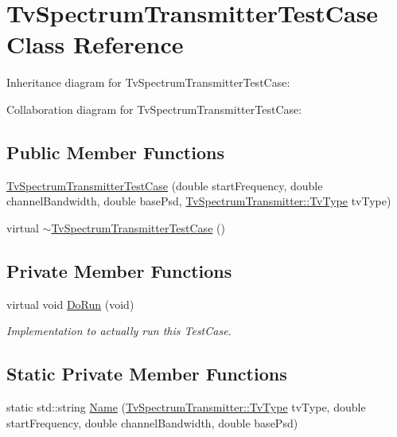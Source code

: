 \hypertarget{classTvSpectrumTransmitterTestCase}{}\section{Tv\+Spectrum\+Transmitter\+Test\+Case Class Reference}
\label{classTvSpectrumTransmitterTestCase}


Inheritance diagram for Tv\+Spectrum\+Transmitter\+Test\+Case\+:


Collaboration diagram for Tv\+Spectrum\+Transmitter\+Test\+Case\+:
\subsection*{Public Member Functions}
\begin{DoxyCompactItemize}
\item 
\hyperlink{classTvSpectrumTransmitterTestCase_a19c7a4ea0efb59f60764f7b8c0918669}{Tv\+Spectrum\+Transmitter\+Test\+Case} (double start\+Frequency, double channel\+Bandwidth, double base\+Psd, \hyperlink{classns3_1_1TvSpectrumTransmitter_a9ec4fd6860d2d287b1304397b425f0d8}{Tv\+Spectrum\+Transmitter\+::\+Tv\+Type} tv\+Type)
\item 
virtual \hyperlink{classTvSpectrumTransmitterTestCase_ac08c14cfb46612a570d318fc6cf4cce6}{$\sim$\+Tv\+Spectrum\+Transmitter\+Test\+Case} ()
\end{DoxyCompactItemize}
\subsection*{Private Member Functions}
\begin{DoxyCompactItemize}
\item 
virtual void \hyperlink{classTvSpectrumTransmitterTestCase_ad94f615589a3c3e1216415ed943bcc26}{Do\+Run} (void)
\begin{DoxyCompactList}\small\item\em Implementation to actually run this Test\+Case. \end{DoxyCompactList}\end{DoxyCompactItemize}
\subsection*{Static Private Member Functions}
\begin{DoxyCompactItemize}
\item 
static std\+::string \hyperlink{classTvSpectrumTransmitterTestCase_ad00da581397f827546facb511c88eaf6}{Name} (\hyperlink{classns3_1_1TvSpectrumTransmitter_a9ec4fd6860d2d287b1304397b425f0d8}{Tv\+Spectrum\+Transmitter\+::\+Tv\+Type} tv\+Type, double start\+Frequency, double channel\+Bandwidth, double base\+Psd)
\end{DoxyCompactItemize}
